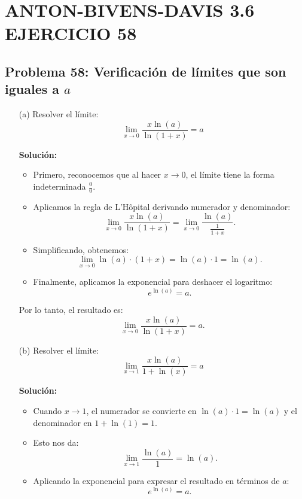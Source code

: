 \chapter*{ANTON-BIVENS-DAVIS 3.6 EJERCICIO 58}

\section*{Problema 58: Verificación de límites que son \\ iguales a $a$}
\begin{enumerate}
    \item[(a)] 
    Resolver el límite:
    \[
    \lim_{x \to 0} \frac{x \ln(a)}{\ln(1 + x)} = a
    \]
    
    \textbf{Solución:}
    
    \begin{itemize}
        \item Primero, reconocemos que al hacer \( x \to 0 \), el límite tiene la forma indeterminada \( \frac{0}{0} \).
        \item Aplicamos la regla de L'Hôpital derivando numerador y denominador:
        \[
        \lim_{x \to 0} \frac{x \ln(a)}{\ln(1 + x)} = \lim_{x \to 0} \frac{\ln(a)}{\frac{1}{1 + x}}.
        \]
        \item Simplificando, obtenemos:
        \[
        \lim_{x \to 0} \ln(a) \cdot (1 + x) = \ln(a) \cdot 1 = \ln(a).
        \]
        \item Finalmente, aplicamos la exponencial para deshacer el logaritmo:
        \[
        e^{\ln(a)} = a.
        \]
    \end{itemize}
    
    Por lo tanto, el resultado es:
    \[
    \lim_{x \to 0} \frac{x \ln(a)}{\ln(1 + x)} = a.
    \]
    
    \item[(b)] 
    Resolver el límite:
    \[
    \lim_{x \to 1} \frac{x \ln(a)}{1 + \ln(x)} = a
    \]
    
    \textbf{Solución:}
    
    \begin{itemize}
        \item Cuando \( x \to 1 \), el numerador se convierte en \( \ln(a) \cdot 1 = \ln(a) \) y el denominador en \( 1 + \ln(1) = 1 \).
        \item Esto nos da:
        \[
        \lim_{x \to 1} \frac{\ln(a)}{1} = \ln(a).
        \]
        \item Aplicando la exponencial para expresar el resultado en términos de \(a\):
        \[
        e^{\ln(a)} = a.
        \]
    \end{itemize}
    

\end{enumerate}
